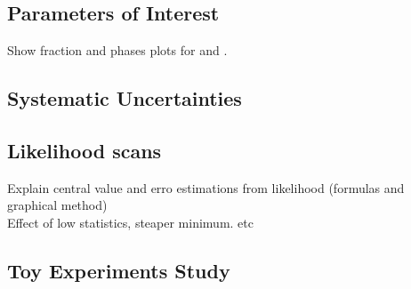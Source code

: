 
\subsection{Parameters of Interest}



Show fraction and phases plots for \Bs and \Bd.
\subsection{Systematic Uncertainties}
\subsection{Likelihood scans}
Explain central value and erro estimations from likelihood (formulas and graphical method)\\
Effect of low statistics, steaper minimum. etc\\
\subsection{Toy Experiments Study}


